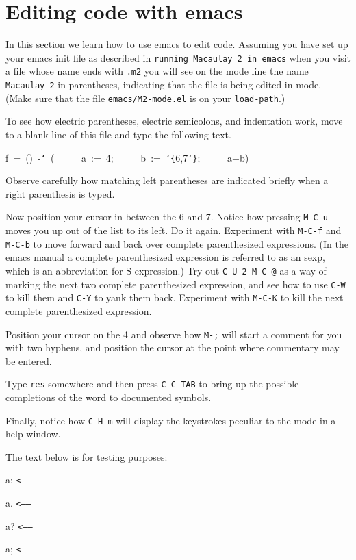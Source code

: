 \section{Editing \Mtwo code with emacs}

In this section we learn how to use emacs to edit \Mtwo code.  Assuming you
have set up your emacs init file as described in {\tt {}running\ Macaulay\ 2\ in\ emacs}
when you visit a file whose name ends with {\tt {}.m2} 
you will see on the mode line the name {\tt {}Macaulay\ 2} in
parentheses, indicating that the file is being edited in \Mtwo mode.  (Make
sure that the file {\tt {}emacs/M2-mode.el} is on your {\tt {}load-path}.)

To see how electric parentheses, electric semicolons, and indentation work,
move to a blank line of this file and type the following text.

\smallskip

{\ttfamily\obeylines
f~=~()~-{\tt\char`\>}~(
~~~~~a~:=~4;
~~~~~b~:=~{\tt\char`\{}6,7{\tt\char`\}};
~~~~~a+b)
}

\smallskip

Observe carefully how matching left parentheses are indicated briefly when a
right parenthesis is typed.

Now position your cursor in between the 6 and 7.  Notice how
pressing {\tt {}M-C-u} moves you up out of the list to its left.  Do it 
again.  Experiment with {\tt {}M-C-f} and {\tt {}M-C-b} to move forward
and back over complete parenthesized
expressions.  (In the emacs manual a complete parenthesized expression is
referred to as an sexp, which is an abbreviation for S-expression.)  Try out
{\tt {}C-U\ 2\ M-C-@} as a way of marking the next two complete parenthesized
expression, and see how to use {\tt {}C-W} to kill them and {\tt {}C-Y} to yank 
them back.  Experiment with {\tt {}M-C-K} to kill the next complete parenthesized 
expression.

Position your cursor on the 4 and observe how {\tt {}M-;} will start a comment 
for you with two hyphens, and position the cursor at the point where commentary
may be entered.

Type {\tt {}res} somewhere and then press {\tt {}C-C\ TAB} to bring up the
possible completions of the word to documented \Mtwo symbols.

Finally, notice how {\tt {}C-H\ m} will display the keystrokes peculiar to 
the mode in a help window.

The text below is for testing purposes:

    \def\f{\edef\g{\the\lastskip}{\tt<----- \g}\par}

    a: \f
    a. \f
    a? \f
    a; \f

